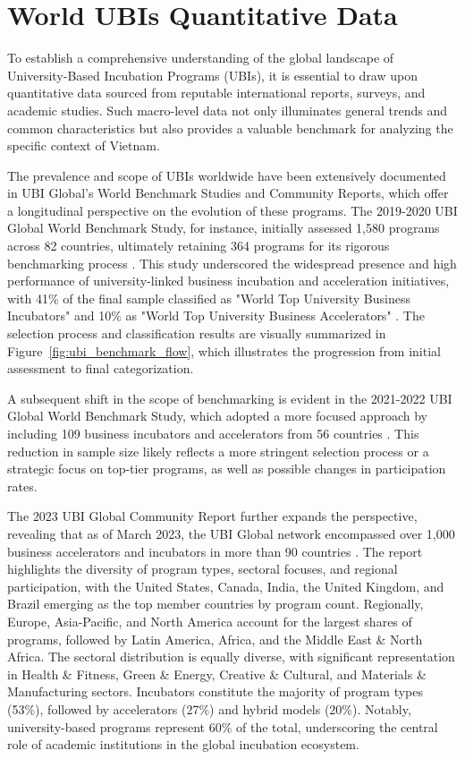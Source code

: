 \documentclass[../Main.tex]{subfiles}%
\begin{document}
	\section{World UBIs Quantitative Data}
	
	To establish a comprehensive understanding of the global landscape of University-Based Incubation Programs (UBIs), it is essential to draw upon quantitative data sourced from reputable international reports, surveys, and academic studies. Such macro-level data not only illuminates general trends and common characteristics but also provides a valuable benchmark for analyzing the specific context of Vietnam.
	
	The prevalence and scope of UBIs worldwide have been extensively documented in UBI Global's World Benchmark Studies and Community Reports, which offer a longitudinal perspective on the evolution of these programs. The 2019-2020 UBI Global World Benchmark Study, for instance, initially assessed 1,580 programs across 82 countries, ultimately retaining 364 programs for its rigorous benchmarking process \cite{ubi2019world}. This study underscored the widespread presence and high performance of university-linked business incubation and acceleration initiatives, with 41\% of the final sample classified as "World Top University Business Incubators" and 10\% as "World Top University Business Accelerators" \cite{ubi2019world}. The selection process and classification results are visually summarized in Figure~\ref{fig:ubi_benchmark_flow}, which illustrates the progression from initial assessment to final categorization.
	
	A subsequent shift in the scope of benchmarking is evident in the 2021-2022 UBI Global World Benchmark Study, which adopted a more focused approach by including 109 business incubators and accelerators from 56 countries \cite{ubi2021world}. This reduction in sample size likely reflects a more stringent selection process or a strategic focus on top-tier programs, as well as possible changes in participation rates.
	
	The 2023 UBI Global Community Report further expands the perspective, revealing that as of March 2023, the UBI Global network encompassed over 1,000 business accelerators and incubators in more than 90 countries \cite{Amin2024Incubators}. The report highlights the diversity of program types, sectoral focuses, and regional participation, with the United States, Canada, India, the United Kingdom, and Brazil emerging as the top member countries by program count. Regionally, Europe, Asia-Pacific, and North America account for the largest shares of programs, followed by Latin America, Africa, and the Middle East \& North Africa. The sectoral distribution is equally diverse, with significant representation in Health \& Fitness, Green \& Energy, Creative \& Cultural, and Materials \& Manufacturing sectors. Incubators constitute the majority of program types (53\%), followed by accelerators (27\%) and hybrid models (20\%). Notably, university-based programs represent 60\% of the total, underscoring the central role of academic institutions in the global incubation ecosystem.
	
\end{document}
